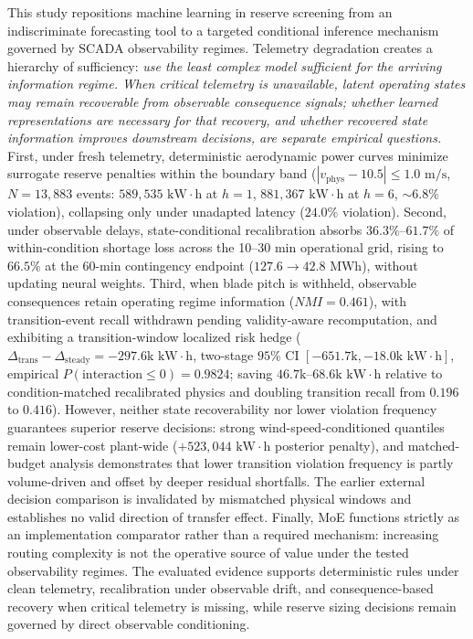 \documentclass[
  journal]{IEEEtran}
\begin{document}
This study repositions machine learning in reserve screening from an
indiscriminate forecasting tool to a targeted conditional inference
mechanism governed by SCADA observability regimes. Telemetry degradation
creates a hierarchy of sufficiency:
\textit{use the least complex model sufficient for the arriving information regime. When critical telemetry is unavailable, latent operating states may remain recoverable from observable consequence signals; whether learned representations are necessary for that recovery, and whether recovered state information improves downstream decisions, are separate empirical questions.}
First, under fresh telemetry, deterministic aerodynamic power curves
minimize surrogate reserve penalties within the boundary band
(\(|v_{\text{phys}}-10.5|\le 1.0\text{ m/s}\), \(N=13{,}883\) events:
\(589{,}535\text{ kW}\cdot\text{h}\) at \(h=1\),
\(881{,}367\text{ kW}\cdot\text{h}\) at \(h=6\), \(\sim 6.8\%\)
violation), collapsing only under unadapted latency (\(24.0\%\)
violation). Second, under observable delays, state-conditional
recalibration absorbs \(36.3\%\)--\(61.7\%\) of within-condition
shortage loss across the 10--30 min operational grid, rising to
\(66.5\%\) at the 60-min contingency endpoint
(\(127.6 \to 42.8\text{ MWh}\)), without updating neural weights. Third,
when blade pitch is withheld, observable consequences retain operating
regime information (\(NMI=0.461\)), with transition-event recall
withdrawn pending validity-aware recomputation, and exhibiting a
transition-window localized risk hedge
(\(\Delta_{\text{trans}} - \Delta_{\text{steady}} = -297.6\text{k}\text{ kW}\cdot\text{h}\),
two-stage
\(95\%\text{ CI } [-651.7\text{k}, -18.0\text{k}\text{ kW}\cdot\text{h}]\),
empirical \(P(\text{interaction} \le 0) = 0.9824\); saving
\(46.7\text{k}\text{--}68.6\text{k kW}\cdot\text{h}\) relative to
condition-matched recalibrated physics and doubling transition recall
from \(0.196\) to \(0.416\)). However, neither state recoverability nor
lower violation frequency guarantees superior reserve decisions: strong
wind-speed-conditioned quantiles remain lower-cost plant-wide
(\(+523{,}044\text{ kW}\cdot\text{h}\) posterior penalty), and
matched-budget analysis demonstrates that lower transition violation
frequency is partly volume-driven and offset by deeper residual
shortfalls. The earlier external decision comparison is invalidated by
mismatched physical windows and establishes no valid direction of
transfer effect. Finally, MoE functions strictly as an implementation
comparator rather than a required mechanism: increasing routing
complexity is not the operative source of value under the tested
observability regimes. The evaluated evidence supports deterministic
rules under clean telemetry, recalibration under observable drift, and
consequence-based recovery when critical telemetry is missing, while
reserve sizing decisions remain governed by direct observable
conditioning.
\end{document}

